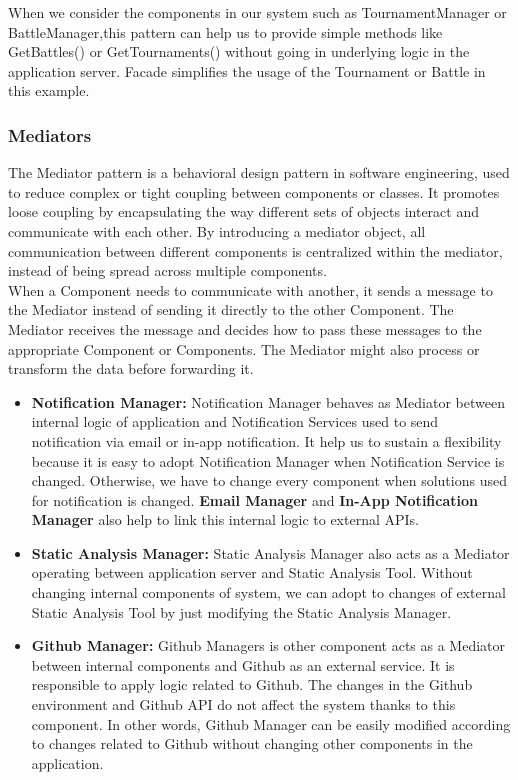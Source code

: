 When we consider the components in our system such as  TournamentManager or BattleManager,this pattern can help us to provide simple methods like GetBattles() or GetTournaments() without going in underlying logic in the application server. Facade simplifies the usage of the Tournament or Battle in this example.

\subsubsection{Mediators}
The Mediator pattern is a behavioral design pattern in software engineering, used to reduce complex or tight coupling between components or classes. It promotes loose coupling by encapsulating the way different sets of objects interact and communicate with each other. By introducing a mediator object, all communication between different components is centralized within the mediator, instead of being spread across multiple components.
\\
When a Component needs to communicate with another, it sends a message to the Mediator instead of sending it directly to the other Component.
The Mediator receives the message and decides how to pass these messages to the appropriate Component or Components.
The Mediator might also process or transform the data before forwarding it.
\begin{itemize}
    \item \textbf{Notification Manager:} Notification Manager behaves as Mediator between internal logic of application and Notification Services used to send notification via email or in-app notification. It help us to sustain a flexibility because it is easy to adopt Notification Manager when Notification Service is changed. Otherwise, we have to change every component when solutions used for notification is changed. \textbf{Email Manager} and \textbf{In-App Notification Manager} also help to link this internal logic to external APIs.
    \item \textbf{Static Analysis Manager:} Static Analysis Manager also acts as a Mediator operating between application server and Static Analysis Tool. Without changing internal components of system, we can adopt to changes of external Static Analysis Tool by just modifying the Static Analysis Manager.
    \item \textbf{Github Manager:} Github Managers is other component acts as a Mediator between internal components and Github as an external service. It is responsible to apply logic related to Github. The changes in the Github environment and Github API do not affect the system thanks to this component. In other words, Github Manager can be easily modified according to changes related to Github without changing other components in the application.
\end{itemize}


